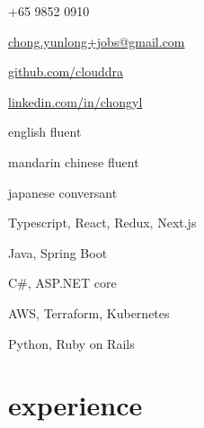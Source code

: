 \documentclass[]{cv} %
\begin{document}

\begin{multicols}{3}
\begin{infoitemize}
\item +65 9852 0910
\item \href{mailto:chong.yunlong+jobs@gmail.com}{chong.yunlong+jobs@gmail.com}
\item \href{https://github.com/clouddra}{github.com/clouddra}
\item \href{https://sg.linkedin.com/in/chongyl}{linkedin.com/in/chongyl}
\end{infoitemize}
\vspace*{\fill}
\columnbreak
{}
\begin{infoitemize}
\item english \to fluent
\item mandarin chinese \to fluent
\item japanese \to conversant
\end{infoitemize}
\vspace*{\fill}
\columnbreak
{}
\begin{infoitemize}
\item Typescript, React, Redux, Next.js
\item Java, Spring Boot
\item C\#, ASP.NET core
\item AWS, Terraform, Kubernetes
\item Python, Ruby on Rails
\end{infoitemize}
\end{multicols}

\vspace{-1\parsep}


\section{experience}
\end{document}
